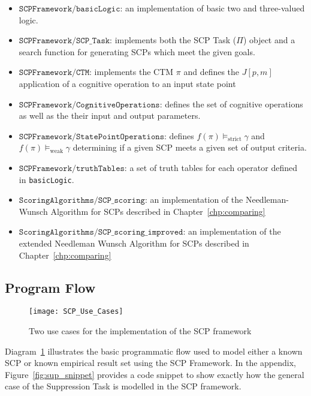 \begin{itemize}
\item $\texttt{SCPFramework/basicLogic}$: an implementation of basic two and three-valued logic.
\item $\texttt{SCPFramework/SCP\_Task}$: implements both the SCP Task ($\Pi$) object and a search function for generating SCPs which meet the given goals.
\item $\texttt{SCPFramework/CTM}$: implements the CTM $\pi$ and defines the $J[p,m]$ application of a cognitive operation to an input state point
\item $\texttt{SCPFramework/CognitiveOperations}$: defines the set of cognitive operations as well as the their input and output parameters.
\item $\texttt{SCPFramework/StatePointOperations}$: defines $f(\pi) \models_\text{strict} \gamma$ and $f(\pi) \models_\text{weak} \gamma$ determining if a given SCP meets a given set of output criteria.
\item $\texttt{SCPFramework/truthTables}$: a set of truth tables for each operator defined in \texttt{basicLogic}.
\item $\texttt{ScoringAlgorithms/SCP\_scoring}$: an implementation of the Needleman-Wunsch Algorithm for SCPs described in Chapter~\ref{chp:comparing}
\item $\texttt{ScoringAlgorithms/SCP\_scoring\_improved}$: an implementation of the extended Needleman Wunsch Algorithm for SCPs described in Chapter~\ref{chp:comparing}
\end{itemize}

\subsection{Program Flow}
\begin{figure}
\centering \texttt{[image: SCP\_Use\_Cases]}
\caption{Two use cases for the implementation of the SCP framework}
\label{fig:SCP_Use_Cases}
\end{figure}



Diagram~\ref{fig:SCP_Use_Cases} illustrates the basic programmatic flow used to model either a known SCP or known empirical result set using the SCP Framework. In the appendix, Figure~\ref{fig:sup_snippet} provides a code snippet to show exactly how the general case of the Suppression Task is modelled in the SCP framework.



